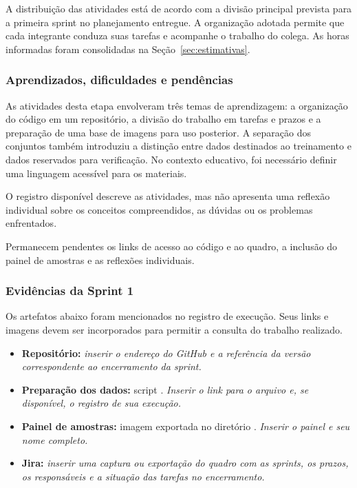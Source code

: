 \documentclass[12pt,a4paper]{article}
\newcommand{\pendente}[1]{\textit{#1}}
\begin{document}
A distribuição das atividades está de acordo com a divisão principal prevista para a primeira sprint no planejamento entregue. A organização adotada permite que cada integrante conduza suas tarefas e acompanhe o trabalho do colega. As horas informadas foram consolidadas na Seção~\ref{sec:estimativas}.

\subsubsection{Aprendizados, dificuldades e pendências}
As atividades desta etapa envolveram três temas de aprendizagem: a organização do código em um repositório, a divisão do trabalho em tarefas e prazos e a preparação de uma base de imagens para uso posterior. A separação dos conjuntos também introduziu a distinção entre dados destinados ao treinamento e dados reservados para verificação. No contexto educativo, foi necessário definir uma linguagem acessível para os materiais.

O registro disponível descreve as atividades, mas não apresenta uma reflexão individual sobre os conceitos compreendidos, as dúvidas ou os problemas enfrentados.

Permanecem pendentes os links de acesso ao código e ao quadro, a inclusão do painel de amostras e as reflexões individuais.

\subsubsection{Evidências da Sprint 1}
Os artefatos abaixo foram mencionados no registro de execução. Seus links e imagens devem ser incorporados para permitir a consulta do trabalho realizado.
\begin{itemize}
\item \textbf{Repositório:} \pendente{inserir o endereço do GitHub e a referência da versão correspondente ao encerramento da sprint.}
\item \textbf{Preparação dos dados:} script . \pendente{Inserir o link para o arquivo e, se disponível, o registro de sua execução.}
\item \textbf{Painel de amostras:} imagem exportada no diretório . \pendente{Inserir o painel e seu nome completo.}
\item \textbf{Jira:} \pendente{inserir uma captura ou exportação do quadro com as sprints, os prazos, os responsáveis e a situação das tarefas no encerramento.}
\end{itemize}
\end{document}

